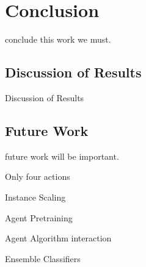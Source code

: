 \chapter{Conclusion}
conclude this work we must.
\section{Discussion of Results} \label{sec:EvalDiscussion}
Discussion of Results
\section{Future Work}
future work will be important.

Only four actions

Instance Scaling

Agent Pretraining

Agent Algorithm interaction

Ensemble Classifiers

